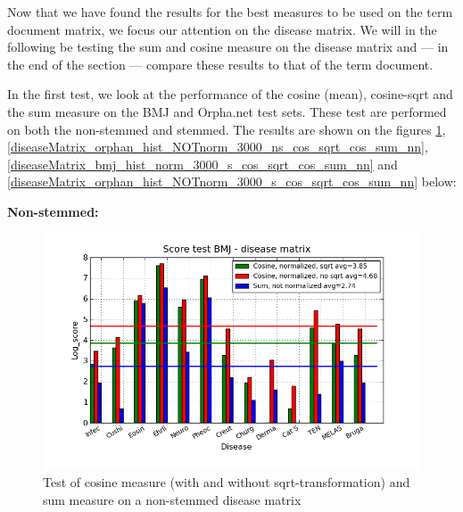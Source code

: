 Now that we have found the results for the best measures to be used on
the term document matrix, we focus our attention on the disease
matrix. We will in the following be testing the sum and cosine measure
on the disease matrix and --- in the end of the section --- compare these
results to that of the term document.

In the first test, we look at the performance of the cosine (mean),
cosine-sqrt and the sum measure on the BMJ and Orpha.net test
sets. These test are performed on both the non-stemmed and
stemmed. The results are shown on the figures
\ref{diseaseMatrix_bmj_hist_norm_3000_ns_cos_sqrt_cos_sum_nn},
\ref{diseaseMatrix_orphan_hist_NOTnorm_3000_ns_cos_sqrt_cos_sum_nn},
\ref{diseaseMatrix_bmj_hist_norm_3000_s_cos_sqrt_cos_sum_nn} and
\ref{diseaseMatrix_orphan_hist_NOTnorm_3000_s_cos_sqrt_cos_sum_nn}
below:

\textbf{Non-stemmed:}

\begin{figure}[H]
  \caption{Test of cosine measure (with and without sqrt-transformation) and sum measure on a non-stemmed disease matrix}
  \begin{center}
    \includegraphics[width=1.2\textwidth]{barcharts/diseaseMatrix_bmj_hist_norm_3000_ns_cos_sqrt_cos_sum_nn.png}
  \end{center}
  \label{diseaseMatrix_bmj_hist_norm_3000_ns_cos_sqrt_cos_sum_nn}
\end{figure}

